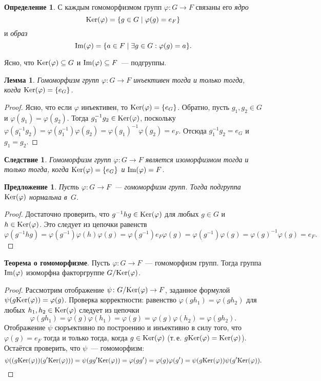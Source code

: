 \documentclass[a4paper,10pt]{amsart}
\def\Ker{{\rm Ker}}%
\def\Im{{\rm Im}}%
\newtheorem{proposition}{Предложение}
\newtheorem{lemma}{Лемма}
\newtheorem{corollary}{Следствие}
\theoremstyle{definition}
\newtheorem{definition}{Определение}
\theoremstyle{remark}
\begin{document}
\begin{definition}
С каждым гомоморфизмом групп $\varphi\colon G\to F$ связаны его {\it
ядро}
$$
\Ker(\varphi)=\{g\in G \mid \varphi(g)=e_F\}
$$
и {\it образ}
$$
\Im(\varphi)=\{a\in F \mid \exists g\in G : \varphi(g)=a\}.
$$
\end{definition}

Ясно, что $\Ker(\varphi)\subseteq G$ и $\Im(\varphi)\subseteq F$~---
подгруппы.

\begin{lemma}
Гомоморфизм групп $\varphi \colon G \to F$ инъективен тогда и только
тогда, когда $\Ker(\varphi) = \{e_G\}$.
\end{lemma}
\vspace{-3mm}
\begin{proof}
Ясно, что если $\varphi$ инъективен, то $\Ker(\varphi) = \lbrace e_G
\rbrace$. Обратно, пусть $g_1, g_2 \in G$ и $\varphi(g_1) =
\varphi(g_2)$. Тогда $g_1^{-1} g_2 \in \Ker(\varphi)$, поскольку
$\varphi(g_1^{-1} g_2) = \varphi(g_1^{-1}) \varphi(g_2) =
\varphi(g_1)^{-1} \varphi (g_2) = e_F$. Отсюда $g_1^{-1}g_2 = e_G$ и
$g_1 = g_2$.
\end{proof}

\begin{corollary}
Гомоморфизм групп $\varphi\colon G\to F$ является изоморфизмом тогда
и только тогда, когда $\Ker(\varphi)=\{e_G\}$ и $\Im(\varphi)=F$.
\end{corollary}

\begin{proposition}
Пусть $\varphi \colon G \to F$~--- гомоморфизм групп. Тогда
подгруппа $\Ker(\varphi)$ нормальна в~$G$.
\end{proposition}
\vspace{-3mm}
\begin{proof}
Достаточно проверить, что $g^{-1}hg \in \Ker(\varphi)$ для любых
$g\in G$ и $h \in \Ker(\varphi)$. Это следует из цепочки равенств
$$
\varphi(g^{-1}hg) = \varphi(g^{-1}) \varphi(h) \varphi(g) =
\varphi(g^{-1}) e_F \varphi(g) = \varphi(g^{-1}) \varphi(g) =
\varphi(g)^{-1} \varphi (g) = e_F.
$$
\end{proof}

{\bf Теорема о гомоморфизме}. Пусть $\varphi\colon G\to F$~---
гомоморфизм групп. Тогда группа $\Im(\varphi)$ изоморфна
факторгруппе $G/\Ker(\varphi)$.

\begin{proof}
Рассмотрим отображение $\psi \colon G / \Ker(\varphi) \to F$,
заданное формулой $\psi(g\Ker(\varphi)) = \varphi(g)$. Проверка
корректности: равенство $\varphi(gh_1)=\varphi(gh_2)$ для любых
$h_1,h_2\in\Ker(\varphi)$ следует из цепочки
$$
\varphi(gh_1)=\varphi(g)\varphi(h_1)=\varphi(g)=\varphi(g)\varphi(h_2)=\varphi(gh_2).
$$
Отображение $\psi$ сюръективно по построению и инъективно в силу
того, что $\varphi(g) = e_F$ тогда и только тогда, когда $g \in \Ker
(\varphi)$ (т.\,е. $g\Ker(\varphi) = \Ker(\varphi)$). Остаётся
проверить, что $\psi$~--- гомоморфизм:
$$
\psi((g\Ker(\varphi))(g'\Ker(\varphi))) = \psi(gg'\Ker(\varphi)) =
\varphi(gg') = \varphi(g)\varphi(g') =
\psi(g\Ker(\varphi))\psi(g'\Ker(\varphi)).
$$
\end{proof}
\end{document}
